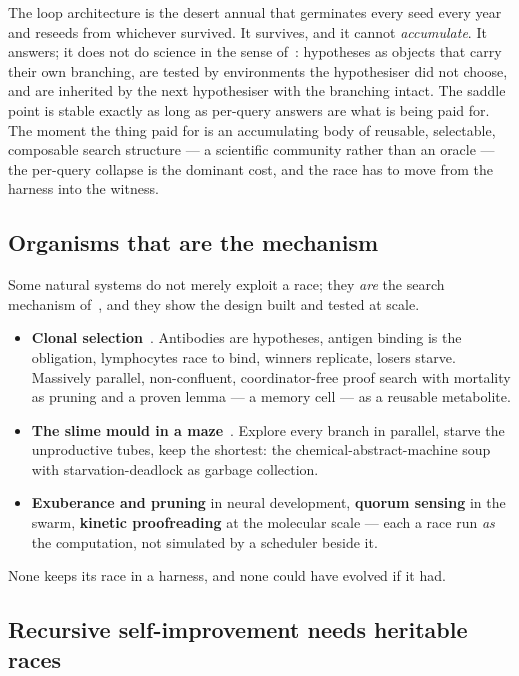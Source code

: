 \documentclass[11pt]{article}
\theoremstyle{plain}
\theoremstyle{definition}
\theoremstyle{remark}
\begin{document}
The loop architecture is the desert annual that germinates every seed every
year and reseeds from whichever survived. It survives, and it cannot
\emph{accumulate}. It answers; it does not do science in the sense
of~\cite{Scientist}: hypotheses as objects that carry their own branching, are
tested by environments the hypothesiser did not choose, and are inherited by
the next hypothesiser with the branching intact. The saddle point is stable
exactly as long as per-query answers are what is being paid for. The moment
the thing paid for is an accumulating body of reusable, selectable, composable
search structure --- a scientific community rather than an oracle --- the
per-query collapse is the dominant cost, and the race has to move from the
harness into the witness.

\subsection{Organisms that are the mechanism}

Some natural systems do not merely exploit a race; they \emph{are} the search
mechanism of~\cite{ProofSearch}, and they show the design built and tested at
scale.

\begin{itemize}[leftmargin=2.2em,itemsep=0.25em]
\item \textbf{Clonal selection}~\cite{Burnet59}. Antibodies are hypotheses,
antigen binding is the obligation, lymphocytes race to bind, winners
replicate, losers starve. Massively parallel, non-confluent, coordinator-free
proof search with mortality as pruning and a proven lemma --- a memory cell
--- as a reusable metabolite.
\item \textbf{The slime mould in a maze}~\cite{Nakagaki00}. Explore every
branch in parallel, starve the unproductive tubes, keep the shortest: the
chemical-abstract-machine soup with starvation-deadlock as garbage
collection.
\item \textbf{Exuberance and pruning} in neural development, \textbf{quorum
sensing} in the swarm, \textbf{kinetic proofreading} at the molecular scale
--- each a race run \emph{as} the computation, not simulated by a scheduler
beside it.
\end{itemize}

None keeps its race in a harness, and none could have evolved if it had.

\subsection{Recursive self-improvement needs heritable races}
\end{document}
